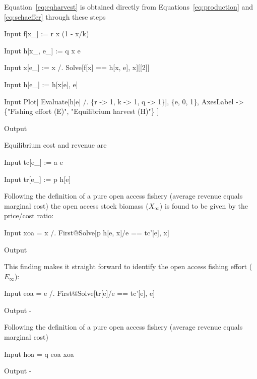 \documentclass[11pt,fleqn]{book} %
\begin{document}
\begin{theorem}
\hfill \break
Equation~\ref{eq:eqharvest} is obtained directly from Equations~\ref{eq:production} and \ref{eq:schaeffer} through these steps
\begin{mmaCell}[index=1]{Input}
  f[x_] := r x (1 - x/k)
\end{mmaCell}
\begin{mmaCell}{Input}
  h[x_, e_] := q x e
\end{mmaCell}
\begin{mmaCell}{Input}
  x[e_] := x /. Solve[f[x] == h[x, e], x][[2]]
\end{mmaCell}
\begin{mmaCell}{Input}
  h[e_] := h[x[e], e]
\end{mmaCell}
\begin{mmaCell}{Input}
  Plot[
    Evaluate[h[e] /. \{r -> 1, k -> 1, q -> 1\}], 
    \{e, 0, 1\}, 
    AxesLabel -> \{"Fishing effort (E)", "Equilibrium harvest (H)"\}
  ]
\end{mmaCell}
\begin{mmaCell}[moregraphics={moreig={scale=.8}}]{Output}
\end{mmaCell}
Equilibrium cost and revenue are
\begin{mmaCell}{Input}
  tc[e_] := a e
\end{mmaCell}
\begin{mmaCell}{Input}
  tr[e_] := p h[e]
\end{mmaCell}
Following the definition of a pure open access fishery (average revenue equals marginal cost) the open access stock biomass ($X_\infty$) is found to be given by the price/cost ratio:
\begin{mmaCell}{Input}
  xoa = x /. First@Solve[p h[e, x]/e == tc'[e], x]
\end{mmaCell}
\begin{mmaCell}{Output}
\end{mmaCell}
This finding makes it straight forward to identify the open access fishing effort ($E_\infty$):
\begin{mmaCell}{Input}
  eoa = e /. First@Solve[tr[e]/e == tc'[e], e]
\end{mmaCell}
\begin{mmaCell}{Output}
  - 
\end{mmaCell}
Following the definition of a pure open access fishery (average revenue equals marginal cost)
\begin{mmaCell}{Input}
  hoa = q eoa xoa
\end{mmaCell}
\begin{mmaCell}{Output}
  - 
\end{mmaCell}
\label{code:openaccess}
\end{theorem}
\end{document}
